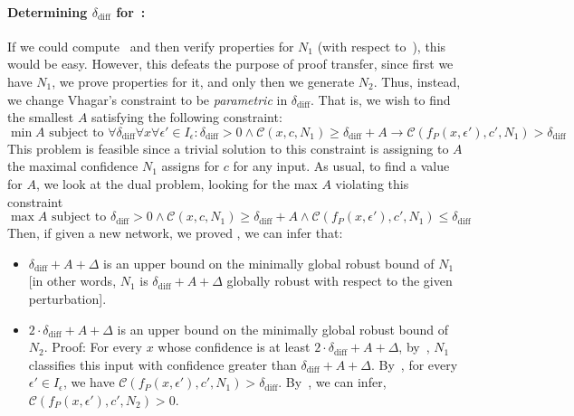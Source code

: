 \documentclass[11pt]{article}
\begin{document}
\paragraph{Determining $\delta_\text{diff}$ for~:}
If we could compute~ and then verify properties for $N_1$ (with respect to~), this would be easy. However, this defeats the purpose of proof transfer, since first we have $N_1$, we prove properties for it, and only then we generate $N_2$. 
Thus, instead, %
we change Vhagar's constraint to be \emph{parametric} in $\delta_\text{diff}$. That is, we wish to find the smallest $A$ satisfying the following constraint:
\begin{equation}\label{eq:func}
\min A\text { subject to }\forall \delta_\text{diff} \forall{x}\forall{\epsilon'}\in{I_\epsilon}:    \delta_\text{diff}>0\land \mathcal{C}(x,c,N_1) \geq \delta_\text{diff} + A\rightarrow \mathcal{C}(f_P(x,\epsilon'),c',N_1)>\delta_\text{diff}
\end{equation}
This problem is feasible since a trivial solution to this constraint is assigning to $A$ the maximal confidence $N_1$ assigns for $c$ for any input. %
As usual, to find a value for $A$, we look at the dual problem, looking for the max $A$ violating this constraint
\begin{equation}\label{eq:ourproof}
 \max A \text{ subject to } \delta_\text{diff}>0\land \mathcal{C}(x,c,N_1) \geq \delta_\text{diff} + A\land \mathcal{C}(f_P(x,\epsilon'),c',N_1)\leq \delta_\text{diff}
 \end{equation}
  Then, if given a new network, we proved , we can infer that:
  \begin{itemize}
    \item $ \delta_\text{diff} +A+\Delta$ is an upper bound on the minimally global robust bound of $N_1$ [in other words, $N_1$ is $ \delta_\text{diff} +A+\Delta$ globally robust with respect to the given perturbation].
    \item $ 2\cdot \delta_\text{diff} +A+\Delta$ is an upper bound on the minimally global robust bound of $N_2$. Proof:
    For every $x$ whose confidence is at least $2\cdot \delta_\text{diff} +A+\Delta$, by~, $N_1$ classifies this input with confidence greater than $\delta_\text{diff} +A+\Delta$. By~, for every $\epsilon'\in I_\epsilon$, we have $\mathcal{C}(f_P(x,\epsilon'),c',N_1)>\delta_\text{diff}$. By~, we can infer, $\mathcal{C}(f_P(x,\epsilon'),c',N_2)>0$. 
  \end{itemize}
\end{document}
